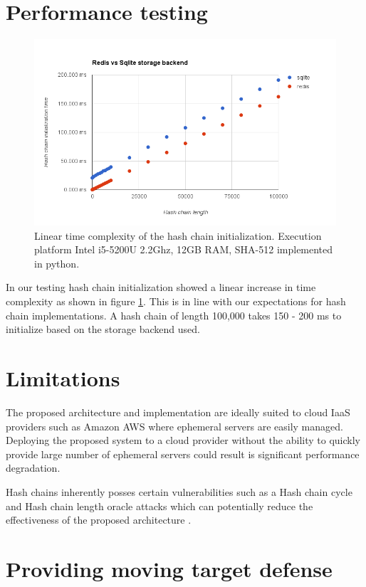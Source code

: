 \documentclass{sig-alternate-05-2015}
\begin{document}
\section*{Performance testing}

\begin{figure}[h]
\includegraphics[scale=0.365]{performance}
\caption{Linear time complexity of the hash chain initialization. Execution platform Intel i5-5200U 2.2Ghz, 12GB RAM, SHA-512 implemented in python.}
\label{fig:performance}
\end{figure}

In our testing hash chain initialization showed a linear increase in time complexity as shown in figure \ref{fig:performance}. This is in line with our expectations for hash chain implementations. A hash chain of length 100,000 takes 150 - 200 ms to initialize based on the storage backend used. 

\section*{Limitations}
The proposed architecture and implementation are ideally suited to cloud IaaS providers such as Amazon AWS where ephemeral servers are easily managed. Deploying the proposed system to a cloud provider without the ability to quickly provide large number of ephemeral servers  could result is significant performance degradation. 

Hash chains inherently posses certain vulnerabilities such as a Hash chain cycle and Hash chain length oracle attacks which can potentially reduce the effectiveness of the proposed architecture \cite{lee_hash_2007}.

\section*{Providing moving target defense}
\end{document}
